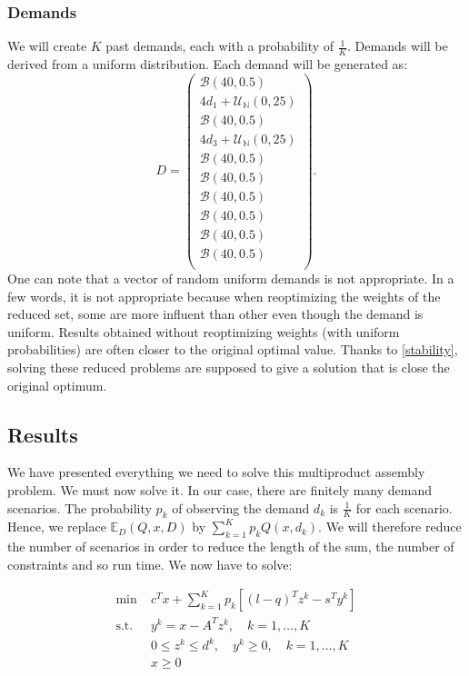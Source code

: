 \documentclass{amsart}
\begin{document}
\subsubsection{Demands}
We will create $K$ past demands, each with a probability of $\frac{1}{K}$. Demands will be derived from a uniform distribution. Each demand will be generated as:
$$
D = \begin{pmatrix} \mathcal{B}\left(40,0.5\right) \\ 4d_1 + \mathcal{U}_\mathbb{N}\left(0,25\right)
  \\ \mathcal{B}\left(40,0.5\right) \\ 4d_3 + \mathcal{U}_\mathbb{N}\left(0,25\right)
  \\ \mathcal{B}\left(40,0.5\right) \\ \mathcal{B}\left(40,0.5\right) \\ \mathcal{B}\left(40,0.5\right) \\ \mathcal{B}\left(40,0.5\right) \\ \mathcal{B}\left(40,0.5\right) \\ \mathcal{B}\left(40,0.5\right) \\ \end{pmatrix}.
$$
One can note that a vector of random uniform demands is not appropriate. In a few words, it is not appropriate because when reoptimizing the weights of the reduced set, some are more influent than other even though the demand is uniform. Results obtained without reoptimizing weights (with uniform probabilities) are often closer to the original optimal value. Thanks to \ref{stability}, solving these reduced problems are supposed to give a solution that is close the original optimum.

\subsection{Results}
We have presented everything we need to solve this multiproduct assembly problem. We must now solve it. In our case, there are finitely many demand scenarios. The probability $p_k$ of observing the demand $d_k$ is $\frac{1}{K}$ for each scenario. Hence, we replace $\mathbb{E}_D\left(Q,x,D\right)$ by $\sum_{k=1}^Kp_kQ\left(x,d_k\right)$. We will therefore reduce the number of scenarios in order to reduce the length of the sum, the number of constraints and so run time. We now have to solve:

\begin{equation}\label{LP}
\begin{aligned}
    \min\; &c^Tx + \sum_{k=1}^{K} p_k \left[ (l - q)^T z^k - s^T y^k \right] \\
    \text{s.t. } & y^k = x - A^T z^k, \quad k = 1, \ldots, K \\
    & 0 \leq z^k \leq d^k, \quad y^k \geq 0, \quad k = 1, \ldots, K \\
    & x \geq 0
\end{aligned}
\end{equation}
\end{document}
